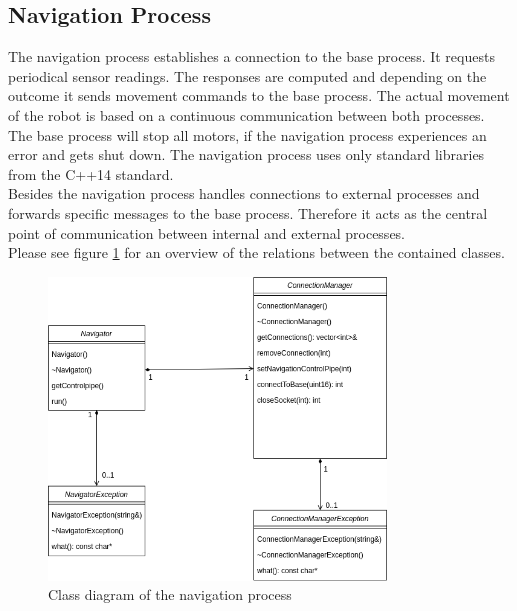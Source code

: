 \newpage

\subsection{Navigation Process}

The navigation process establishes a connection to the base process. It requests periodical sensor readings. The responses are computed and depending on the outcome it sends movement commands to the base process. The actual movement of the robot is based on a continuous communication between both processes. The base process will stop all motors, if the navigation process experiences an error and gets shut down. The navigation process uses only standard libraries from the C++14 standard.\\
Besides the navigation process handles connections to external processes and forwards specific messages to the base process. Therefore it acts as the central point of communication between internal and external processes.\\

Please see figure \ref{fig:class_diagram_navigation} for an overview of the relations between the contained classes.

\begin{figure}[H]
\centering
\includegraphics[width=0.8\textwidth]{sources/class_diagram_navigation.png}
\caption[Class diagram navigation process]{Class diagram of the navigation process}
\label{fig:class_diagram_navigation}
\end{figure}


